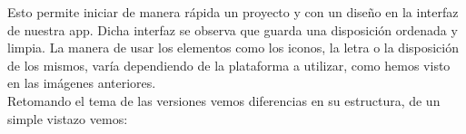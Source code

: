 \documentclass[a4paper, 11pt]{article}
\begin{document}
\begin{itemize}
            Esto permite iniciar de manera rápida un proyecto y con un diseño en la
            interfaz de nuestra app. Dicha interfaz se observa que guarda una
            disposición ordenada y limpia. La manera de usar los elementos como los
            iconos, la letra o la disposición de los mismos, varía dependiendo de la
            plataforma a utilizar, como hemos visto en las imágenes anteriores.\\

            Retomando el tema de las versiones vemos diferencias en su estructura,
            de un simple vistazo vemos:

              \begin{figure}[H]
                \centering

\end{figure}
\end{itemize}
\end{document}
